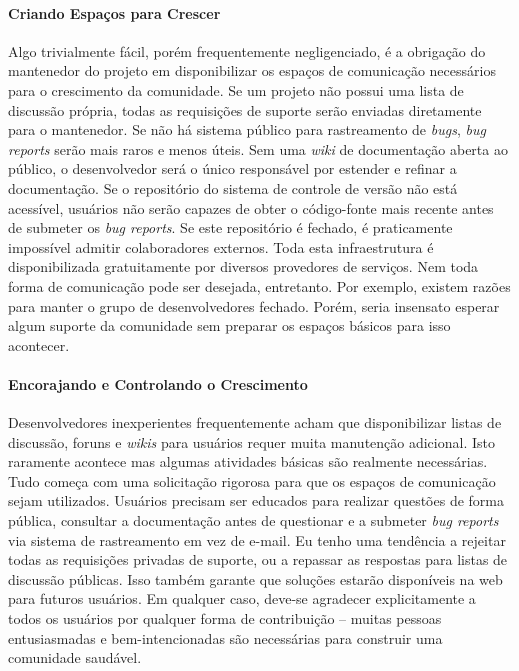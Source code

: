 \paragraph*{Criando Espaços para Crescer}
Algo trivialmente fácil, porém frequentemente negligenciado, é a obrigação do
mantenedor do projeto em disponibilizar os espaços de comunicação necessários
para o crescimento da comunidade. Se um projeto não possui uma lista de discussão
própria, todas as requisições de suporte serão enviadas diretamente para o
mantenedor. Se não há sistema público para rastreamento de \textit{bugs}, \textit{bug reports}
serão mais raros e menos úteis. Sem uma \textit{wiki} de documentação aberta ao público,
o desenvolvedor será o único responsável por estender e refinar a documentação. Se
o repositório do sistema de controle de versão não está acessível, usuários não serão
capazes de obter o código-fonte mais recente antes de submeter os \textit{bug reports}.
Se este repositório é fechado, é praticamente impossível admitir colaboradores externos.
Toda esta infraestrutura é disponibilizada gratuitamente por diversos provedores de
serviços. Nem toda forma de comunicação pode ser desejada, entretanto. Por exemplo,
existem razões para manter o grupo de desenvolvedores fechado. Porém, seria insensato
esperar algum suporte da comunidade sem preparar os espaços básicos para isso acontecer.

\paragraph*{Encorajando e Controlando o Crescimento}
Desenvolvedores inexperientes frequentemente acham que disponibilizar listas de discussão,
foruns e \textit{wikis} para usuários requer muita manutenção adicional. Isto raramente
acontece mas algumas atividades básicas são realmente necessárias. Tudo começa com uma
solicitação rigorosa para que os espaços de comunicação sejam utilizados. Usuários precisam
ser educados para realizar questões de forma pública, consultar a documentação antes
de questionar e a submeter \textit{bug reports} via sistema de rastreamento em vez de e-mail.
Eu tenho uma tendência a rejeitar todas as requisições privadas de suporte, ou a repassar
as respostas para listas de discussão públicas. Isso também garante que soluções estarão
disponíveis na web para futuros usuários. Em qualquer caso, deve-se agradecer explicitamente
a todos os usuários por qualquer forma de contribuição -- muitas pessoas entusiasmadas e
bem-intencionadas são necessárias para construir uma comunidade saudável.


